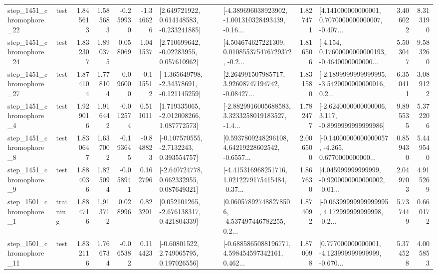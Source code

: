 \begin{tabular}{llrrrrllrlrr}
 step\_1451\_chromophore\_22 &      test &      1.845613 &    1.585683 &     -0.259930 & -1.346626 &    [2.649721922, 0.614148583, -0.233241885] &  [-4.389696038923902, -1.001310328493439, -0.16... &       1.827471 &  [4.141000000000001, 0.7070000000000007, -0.407... &            3.406022 &          8.313190 \\
 step\_1451\_chromophore\_24 &      test &      1.832307 &    1.890375 &      0.058069 &  1.041537 &     [2.710699642, -0.02283955, 0.057610962] &  [4.504674627221309, 0.010855375476729372, -0.2... &       1.816506 &  [-4.154, 0.17600000000000193, -0.4640000000000... &            5.503047 &          9.583260 \\
 step\_1451\_chromophore\_27 &      test &      1.874104 &    1.778104 &     -0.096000 & -0.115512 &   [-1.365649798, -2.34378691, -0.121145259] &  [2.264991507985717, 3.92608747194742, -0.08427... &       1.831580 &  [-2.1899999999999995, -3.5420000000000016, 0.2... &            6.350411 &          3.089122 \\
  step\_1451\_chromophore\_4 &      test &      1.929016 &    1.916442 &     -0.012574 &  0.511011 &    [1.719335065, -2.012008266, 1.087772573] &  [-2.8829916005688583, 3.3233258019183527, -1.4... &       1.782477 &  [-2.6240000000000006, 3.117, -0.8999999999999986] &            9.895535 &          5.372206 \\
  step\_1451\_chromophore\_8 &      test &      1.830647 &    1.637002 &     -0.193645 & -0.848823 &     [-0.107570555, -2.7132243, 0.393554757] &  [0.5937809248296108, 4.64219228602542, -0.6557... &       2.006500 &  [-0.14000000000000057, -4.265, 0.6770000000000... &            0.859430 &          5.449540 \\
  step\_1451\_chromophore\_9 &      test &      1.884036 &    1.825094 &     -0.058941 &  0.162796 &    [-2.640724778, 0.662332955, 0.087649321] &  [-4.415316968251716, 1.0212279175415484, -0.37... &       1.867630 &  [4.045999999999999, -0.9200000000000002, -0.01... &            2.049703 &          4.915269 \\
  step\_1501\_chromophore\_1 &  training &      1.884716 &    1.913712 &      0.028996 &  0.823201 &    [0.052101265, -2.676138317, 0.421804339] &  [0.060578927488278506, -4.537497446782255, 0.2... &       1.874092 &  [-0.06399999999999995, 4.172999999999998, -0.2... &            5.737449 &          0.660172 \\
 step\_1501\_chromophore\_11 &      test &      1.832116 &    1.766734 &     -0.065382 &  0.114423 &     [-0.60801522, 2.749065795, 0.197026556] &  [-0.6885865088196771, 4.598454597342161, 0.462... &       1.870098 &  [0.777000000000001, -4.123999999999999, -0.670... &            5.374528 &          4.005853 \\

\end{tabular}
